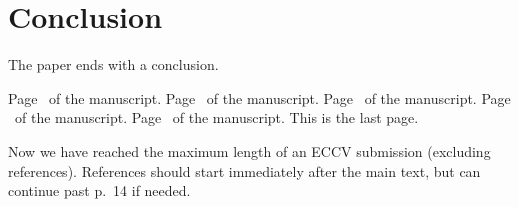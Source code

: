 \documentclass[runningheads]{llncs}
\begin{document}
\section{Conclusion}
The paper ends with a conclusion. 

\clearpage\mbox{}Page \thepage\ of the manuscript.
\clearpage\mbox{}Page \thepage\ of the manuscript.
\clearpage\mbox{}Page \thepage\ of the manuscript.
\clearpage\mbox{}Page \thepage\ of the manuscript.
\clearpage\mbox{}Page \thepage\ of the manuscript. This is the last page.
\par\vfill\par
Now we have reached the maximum length of an ECCV \ECCVyear{} submission (excluding references).
References should start immediately after the main text, but can continue past p.\ 14 if needed.
\clearpage  %


%
%


\end{document}
